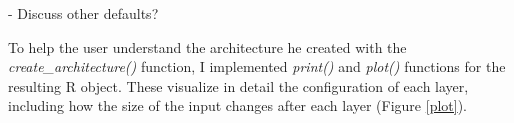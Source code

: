 \documentclass{article}
\newcommand{\fn}[2][]{\textit{#2(}#1\textit{)}}
\begin{document}
- Discuss other defaults?

To help the user understand the architecture he created with the \fn{create\_architecture} function, I implemented \fn{print} and \fn{plot} functions for the resulting R object. These visualize in detail the configuration of each layer, including how the size of the input changes after each layer (Figure \ref{plot}).

\begin{table}
	\centering
	\renewcommand{\arraystretch}{1.3}
\end{table}
\end{document}
